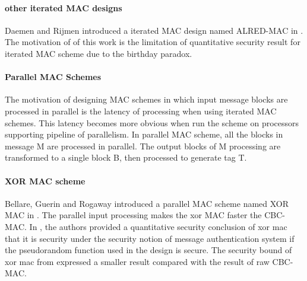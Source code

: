 \documentclass{article}
\begin{document}
\paragraph{other iterated MAC designs}
Daemen and Rijmen introduced a iterated MAC design named ALRED-MAC in \cite{alred}. The motivation of of this work is the limitation of quantitative security result for iterated MAC scheme due to the birthday paradox. 
\paragraph{Parallel MAC Schemes}
The motivation of designing MAC schemes in which input message blocks are processed in parallel is the latency of processing when using iterated MAC schemes. This latency becomes more obvious when run the scheme on processors supporting pipeline of parallelism. 
In parallel MAC scheme, all the blocks in message M are processed in parallel. The output blocks of M processing are transformed to a single block B, then processed to generate tag T. 
\paragraph{XOR MAC scheme}
Bellare, Guerin and Rogaway introduced a parallel MAC scheme named XOR MAC in \cite{xor-mac}. 
The parallel input processing makes the xor MAC faster the CBC-MAC. 
In \cite{xor-mac}, the authors provided a quantitative security conclusion of xor mac that it is security under the security notion of message authentication system if the pseudorandom function used in the design is secure. The security bound of xor mac from \cite{xor-mac} expressed a smaller result compared with the result of raw CBC-MAC. 
\end{document}
